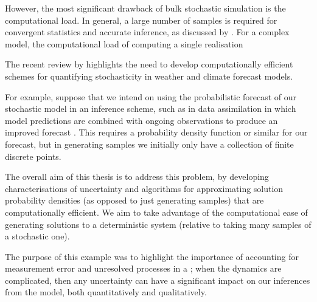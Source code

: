 However, the most significant drawback of bulk stochastic simulation is the computational load.
In general, a large number of samples is required for convergent statistics and accurate inference, as discussed by \citet{Leutbecher_2019_EnsembleSizeHow}.
For a complex model, the computational load of computing a single realisation

The recent review by \citet{LeutbecherEtAl_2017_StochasticRepresentationsModel} highlights the need to develop computationally efficient schemes for quantifying stochasticity in weather and climate forecast models.


For example, suppose that we intend on using the probabilistic forecast of our stochastic model in an inference scheme, such as in data assimilation in which model predictions are combined with ongoing observations to produce an improved forecast \cite[e.g.]{LawEtAl_2015_DataAssimilationMathematical,BudhirajaEtAl_2019_AssimilatingDataModels, ReichCotter_2015_ProbabilisticForecastingBayesian}.
This requires a probability density function or similar for our forecast, but in generating samples we initially only have a collection of finite discrete points.


The overall aim of this thesis is to address this problem, by developing characterisations of uncertainty and algorithms for approximating solution probability densities (as opposed to just generating samples) that are computationally efficient.
We aim to take advantage of the computational ease of generating solutions to a deterministic system (relative to taking many samples of a stochastic one).


The purpose of this example was to highlight the importance of accounting for measurement error and unresolved processes in a ; when the dynamics are complicated, then any uncertainty can have a significant impact on our inferences from the model, both quantitatively and qualitatively.
